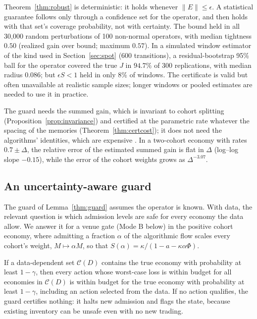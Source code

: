 Theorem~\ref{thm:robust} is deterministic: it holds whenever $\|E\|\le\epsilon$. A statistical guarantee follows only through a confidence set for the operator, and then holds with that set's coverage probability, not with certainty. The bound held in all 30,000 random perturbations of 100 non-normal operators, with median tightness $0.50$ (realized gain over bound; maximum $0.57$). In a simulated window estimator of the kind used in Section~\ref{sec:spot} (600 transitions), a residual-bootstrap 95\% ball for the operator covered the true $J$ in $94.7\%$ of 300 replications, with median radius $0.086$; but $\epsilon S<1$ held in only $8\%$ of windows. The certificate is valid but often unavailable at realistic sample sizes; longer windows or pooled estimates are needed to use it in practice.

The guard needs the summed gain, which is invariant to cohort splitting (Proposition~\ref{prop:invariance}) and certified at the parametric rate whatever the spacing of the memories (Theorem~\ref{thm:certcost}); it does not need the algorithms' identities, which are expensive \citep{niroula2026}. In a two-cohort economy with rates $0.7\pm\Delta$, the relative error of the estimated summed gain is flat in $\Delta$ (log--log slope $-0.15$), while the error of the cohort weights grows as $\Delta^{-3.07}$.


\subsection{An uncertainty-aware guard}\label{sec:robustguard}
The guard of Lemma~\ref{thm:guard} assumes the operator is known. With data, the relevant question is which admission levels are safe for every economy the data allow. We answer it for a venue gate (Mode B below) in the positive cohort economy, where admitting a fraction $\alpha$ of the algorithmic flow scales every cohort's weight, $M\mapsto\alpha M$, so that $S(\alpha)=\kappa/(1-a-\kappa\alpha\Phi)$.

\begin{lemma}\label{lem:sound}
If a data-dependent set $\mathcal C(D)$ contains the true economy with probability at least $1-\gamma$, then every action whose worst-case loss is within budget for all economies in $\mathcal C(D)$ is within budget for the true economy with probability at least $1-\gamma$, including an action selected from the data. If no action qualifies, the guard certifies nothing: it halts new admission and flags the state, because existing inventory can be unsafe even with no new trading.
\end{lemma}


